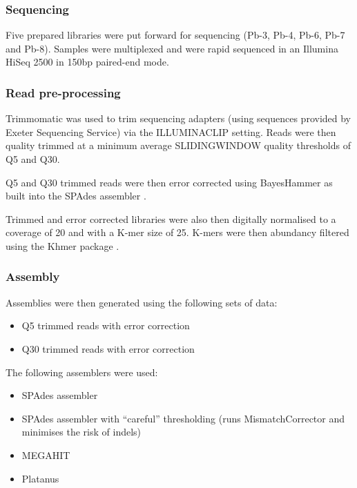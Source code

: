 \subsubsection{Sequencing}

Five prepared libraries were put forward for sequencing 
(Pb-3, Pb-4, Pb-6, Pb-7 and Pb-8).   Samples were
multiplexed and were rapid sequenced in an Illumina
HiSeq 2500 in 150bp paired-end mode. 

\subsubsection{Read pre-processing}

Trimmomatic \citep{Bolger2014a} was used to trim sequencing adapters (using sequences
provided by Exeter Sequencing Service) via the ILLUMINACLIP setting.
Reads were then quality trimmed at a minimum average SLIDINGWINDOW 
quality thresholds of Q5 and Q30. 

Q5 and Q30 trimmed reads were then error corrected using BayesHammer
\citep{Nikolenko2013} as built into the SPAdes assembler \citep{Bankevich2012}.

Trimmed and error corrected libraries were also then digitally normalised
\citep{Brown2012} to a coverage of 20 and with a K-mer size of 25.
K-mers were then abundancy filtered \citep{Zhang2014,Zhang2015}
using the Khmer package \citep{Crusoe2015}.

\subsubsection{Assembly}

Assemblies were then generated using the following sets
of data:

\begin{itemize}
    \item Q5 trimmed reads with error correction
    \item Q30 trimmed reads with error correction
\end{itemize}

The following assemblers were used:
\begin{itemize}
    \item SPAdes assembler \citep{Bankevich2012,Nurk2013}
    \item SPAdes assembler with ``careful'' thresholding (runs MismatchCorrector and minimises the risk 
        of indels)
    \item MEGAHIT \citep{Li2015a}
    \item Platanus \citep{Kajitani2014}
\end{itemize}

